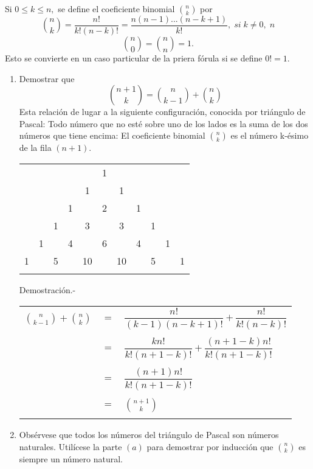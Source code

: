 \begin{ej}
Si $0 \leq k \leq n,$ se define el coeficiente binomial $ {n \choose k} $ por $${n \choose k} = \dfrac{n!}{k!(n-k)!}=\dfrac{n(n-1)...(n - k + 1)}{k!}, \; si \; k \neq 0, \; n$$ $${n \choose 0} = {n \choose n} = 1.$$ Esto se convierte en un caso particular de la priera fórula si se define $0! = 1.$
\begin{enumerate}[\bfseries a)]
\item Demostrar que $${n +1 \choose k} = {n \choose k - 1} + {n \choose k}$$ Esta relación de lugar a la siguiente configuración, conocida por triángulo de Pascal: Todo número que no esté sobre uno de los lados es la suma de los dos números que tiene encima: El coeficiente binomial ${n \choose k}$ es el número k-ésimo de la fila $(n+1)$.
\begin{center}
\begin{tabular}{ccccccccccc}
  &    &    &    &    &  1 &    &    &    &    &   \\
  &    &    &    &  1 &    &  1 &    &    &    &   \\
  &    &    &  1 &    &  2 &    &  1 &    &    &   \\
  &    &  1 &    &  3 &    &  3 &    &  1 &    &   \\
  &  1 &    &  4 &    &  6 &    &  4 &    &  1 &   \\
1 &    &  5 &    & 10 &    & 10 &    &  5 &    & 1 \\\\
\end{tabular}
\end{center}
Demostración.- \; \\
\begin{center}
\begin{tabular}{r c l}
$ {n \choose k-1}  +  {n \choose k} $&$=$&$\dfrac{n!}{(k-1)(n-k+1)!}+ \dfrac{n!}{k!(n-k)!}$\\\\
&$=$&$\dfrac{kn!}{k!(n+1-k)!} + \dfrac{(n+1-k)n!}{k!(n+1-k)!}$\\\\
&$=$&$\dfrac{(n+1)n!}{k!(n+1-k)!}$\\\\
&$=$&$ {n+1 \choose k} $\\\\
\end{tabular}
\end{center}
\item Obsérvese que todos los números del triángulo de Pascal son números naturales. Utilícese la parte $(a)$ para demostrar por inducción que $ {n \choose k}$ es siempre un número natural.\\\\

\end{enumerate}
\end{ej}
